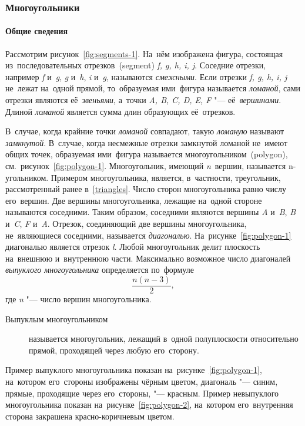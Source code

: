 \documentclass[]{scrartcl}
\begin{document}
\subsubsection{Многоугольники}
\paragraph{Общие сведения}

Рассмотрим рисунок~\ref{fig:segments-1}. На~нём изображена фигура, состоящая из~последовательных отрезков~(\foreignlanguage{english}{segment}) \textit{f, g, h, i, j}. Соседние отрезки, например \textit{f} и~\textit{g}, \textit{g} и~\textit{h}, \textit{i} и~\textit{g}, называются \emph{смежными}. Если отрезки \textit{f, g, h, i, j} не~лежат на~одной прямой, то~образуемая ими~фигура называется \emph{ломаной}, сами отрезки являются её~\emph{звеньями}, а~точки \textit{A, B, C, D, E, F} "--- её~\emph{вершинами}. Длиной \emph{ломаной} является сумма длин образующих её~отрезков.

В~случае, когда крайние точки \emph{ломаной} совпадают, такую \emph{ломаную} называют \emph{замкнутой}. В~случае, когда несмежные отрезки замкнутой ломаной не~имеют общих точек, образуемая ими~фигура называется многоугольником~(\foreignlanguage{english}{polygon}), см.~рисунок~\ref{fig:polygon-1}. Многоугольник, имеющий \textit{n}~вершин, называется n-угольником. Примером многоугольника, является, в~частности, треугольник, рассмотренный ранее в~\ref{triangles}. Число сторон многоугольника равно числу его~вершин. Две вершины многоугольника, лежащие на~одной стороне называются  соседними. Таким образом, соседними являются вершины \textit{A} и~\textit{B}, \textit{B} и~\textit{C}, \textit{F} и~\textit{A}. Отрезок, соединяющий две вершины многоугольника, не~являющиеся соседними, называется \emph{диагональю}. На~рисунке~\ref{fig:polygon-1} диагональю является отрезок \textit{l}. Любой многоугольник делит плоскость на~внешнюю и~внутреннюю части. Максимально возможное число диагоналей \emph{выпуклого многоугольника} определяется по~формуле
\begin{equation}\label{eq:n-polygon-vertex}
\frac{n(n-3)}{2},
\end{equation}
где \textit{n} "--- число вершин многоугольника.

\begin{description}
	\item[Выпуклым многоугольником] называется многоугольник, лежащий в~одной полуплоскости относительно прямой, проходящей через любую его~сторону.
\end{description}
Пример выпуклого многоугольника показан на~рисунке~\ref{fig:polygon-1}, на~котором его~стороны изображены чёрным цветом, диагональ "--- синим, прямые, проходящие через его~стороны, "--- красным.
Пример невыпуклого многоугольника показан на~рисунке~\ref{fig:polygon-2}, на~котором его~внутренняя сторона закрашена красно-коричневым цветом.
\end{document}
